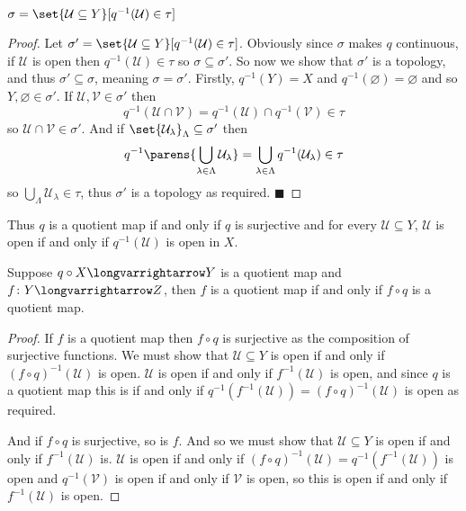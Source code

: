 \documentclass[10pt]{article}
\def\qed{\hskip1cm\penalty-100\hbox{}\hfill$\blacksquare$}
\def\mU{\mathcal{U}}
\def\mV{\mathcal{V}}
\def\longto{\longvarrightarrow}
\begin{document}
\begin{prop*}

    $\sigma=\set{\mU\subseteq Y}[q^{-1}(\mU)\in\tau]$

\end{prop*}

\begin{proof}

    Let $\sigma'=\set{\mU\subseteq Y}[q^{-1}(\mU)\in\tau]$.
    Obviously since $\sigma$ makes $q$ continuous, if $\mU$ is open then $q^{-1}(\mU)\in\tau$ so $\sigma\subseteq\sigma'$.
    So now we show that $\sigma'$ is a topology, and thus $\sigma'\subseteq\sigma$, meaning $\sigma=\sigma'$.
    Firstly, $q^{-1}(Y)=X$ and $q^{-1}(\varnothing)=\varnothing$ and so $Y,\varnothing\in\sigma'$.
    If $\mU,\mV\in\sigma'$ then
    \[ q^{-1}(\mU\cap\mV) = q^{-1}(\mU)\cap q^{-1}(\mV)\in\tau \]
    so $\mU\cap\mV\in\sigma'$.
    And if $\set{\mU_\lambda}_\Lambda\subseteq\sigma'$ then
    \[ q^{-1}\parens{\bigcup_{\lambda\in\Lambda}\mU_\lambda} = \bigcup_{\lambda\in\Lambda} q^{-1}(\mU_\lambda) \in \tau \]
    so $\bigcup_\Lambda\mU_\lambda\in\tau$, thus $\sigma'$ is a topology as required.
    \qed

\end{proof}

Thus $q$ is a quotient map if and only if $q$ is surjective and for every $\mU\subseteq Y$, $\mU$ is open if and only if $q^{-1}(\mU)$ is open in $X$.

\begin{prop*}

    Suppose $q\circ X\longto Y$ is a quotient map and $f\colon Y\longto Z$, then $f$ is a quotient map if and only if $f\circ q$ is a quotient map.

\end{prop*}

\begin{proof}

    If $f$ is a quotient map then $f\circ q$ is surjective as the composition of surjective functions.
    We must show that $\mU\subseteq Y$ is open if and only if $(f\circ q)^{-1}(\mU)$ is open.
    $\mU$ is open if and only if $f^{-1}(\mU)$ is open, and since $q$ is a quotient map this is if and only if $q^{-1}(f^{-1}(\mU))=(f\circ q)^{-1}(\mU)$ is open as required.

    And if $f\circ q$ is surjective, so is $f$.
    And so we must show that $\mU\subseteq Y$ is open if and only if $f^{-1}(\mU)$ is.
    $\mU$ is open if and only if $(f\circ q)^{-1}(\mU)=q^{-1}(f^{-1}(\mU))$ is open and $q^{-1}(\mV)$ is open if and only if $\mV$ is open, so this is open if and only if $f^{-1}(\mU)$ is open.

\end{proof}
\end{document}
